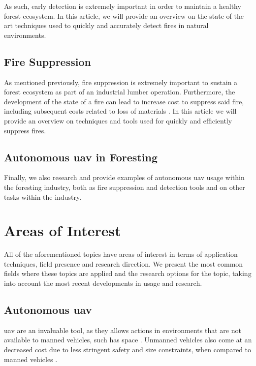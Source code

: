 \documentclass[runningheads]{llncs}
\begin{document}
As such, early detection is extremely important in order to maintain a healthy forest ecosystem. In this article, we will provide an overview on the state of the art techniques used to quickly and accurately detect fires in natural environments.

\subsection{Fire Suppression}

As mentioned previously, fire suppression is extremely important to sustain a forest ecosystem as part of an industrial lumber operation. Furthermore, the development of the state of a fire can lead to increase cost to suppress said fire, including subsequent costs related to loss of materials \cite{Knowling_2016}. In this article we will provide an overview on techniques and tools used for quickly and efficiently suppress fires.

\subsection{Autonomous \acrshort{uav} in Foresting}

Finally, we also research and provide examples of autonomous \acrshort{uav} usage within the foresting industry, both as fire suppression and detection tools and on other tasks within the industry.

\section{Areas of Interest}

All of the aforementioned topics have areas of interest in terms of application techniques, field presence and research direction. We present the most common fields where these topics are applied and the research options for the topic, taking into account the most recent developments in usage and research.

\subsection{Autonomous \acrshort{uav}}

\acrshort{uav} are an invaluable tool, as they allows actions in environments that are not available to manned vehicles, such has space . Unmanned vehicles also come at an decreased cost due to less stringent safety and size constraints, when compared to manned vehicles .
\end{document}
